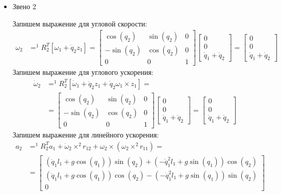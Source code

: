 \documentclass[a4paper,14pt]{extreport}
\begin{document}
\begin{itemize}
\item Звено 2

Запишем выражение для угловой скорости: 
\begin{align*}
\omega_2 &= ^1R_2^T [\omega_1 + \dot q_2 z_1] = 
\left[\begin{matrix}\cos{\left (q_{2} \right )} & \sin{\left (q_{2} \right )} & 0\\- \sin{\left (q_{2} \right )} & \cos{\left (q_{2} \right )} & 0\\0 & 0 & 1\end{matrix}\right]
\left[\begin{matrix}0\\0\\\dot{q}_1 + \dot{q}_2\end{matrix}\right]
=
\left[\begin{matrix}0\\0\\\dot{q}_1 + \dot{q}_2\end{matrix}\right]
\end{align*}
Запишем выражение для углового ускорения:
\begin{align*}
\dot \omega_2 &= ^1R_2^T [\dot \omega_1 + \ddot q_2 z_1 + \dot q_2 \omega_1 \times z_1] 
=\\
&=
\left[\begin{matrix}\cos{\left (q_{2} \right )} & \sin{\left (q_{2} \right )} & 0\\- \sin{\left (q_{2} \right )} & \cos{\left (q_{2} \right )} & 0\\0 & 0 & 1\end{matrix}\right]
\left[\begin{matrix}0\\0\\\ddot{q}_1 + \ddot{q}_2\end{matrix}\right]
=
\left[\begin{matrix}0\\0\\\ddot{q}_1 + \ddot{q}_2\end{matrix}\right]
\end{align*}
Запишем выражение для линейного ускорения:
\begin{align*}
a_2 &= ^1R_2^T a_1 + \dot \omega_2 \times ^2r_{12} + \omega_2 \times (\omega_2 \times ^2r_{11}) = \\
&=
\left[\begin{matrix}\left(\ddot{q}_1 l_{1} + g \cos{\left (q_{1} \right )}\right) \sin{\left (q_{2} \right )} + \left(- \dot{q}_1^{2} l_{1} + g \sin{\left (q_{1} \right )}\right) \cos{\left (q_{2} \right )}\\\left(\ddot{q}_1 l_{1} + g \cos{\left (q_{1} \right )}\right) \cos{\left (q_{2} \right )} - \left(- \dot{q}_1^{2} l_{1} + g \sin{\left (q_{1} \right )}\right) \sin{\left (q_{2} \right )}\\0\end{matrix}\right]

\end{align*}
\end{itemize}
\end{document}
